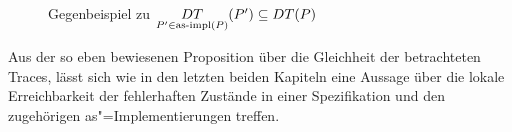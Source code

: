 \begin{figure}[htbp]
  \begin{center}
    \caption{Gegenbeispiel zu $\underset{P'\in\mathrm{as}\text{-}\mathrm{impl} (P)} {DT} (P') \subseteq
    DT (P)$}
    \label{DTAsimpInDTGegenBsp}
  \end{center}
\end{figure}

Aus der so eben bewiesenen Proposition über die Gleichheit der betrachteten
Traces, lässt sich wie in den letzten beiden Kapiteln eine Aussage über die
lokale Erreichbarkeit der fehlerhaften Zustände in einer Spezifikation und den
zugehörigen as"=Implementierungen treffen.

